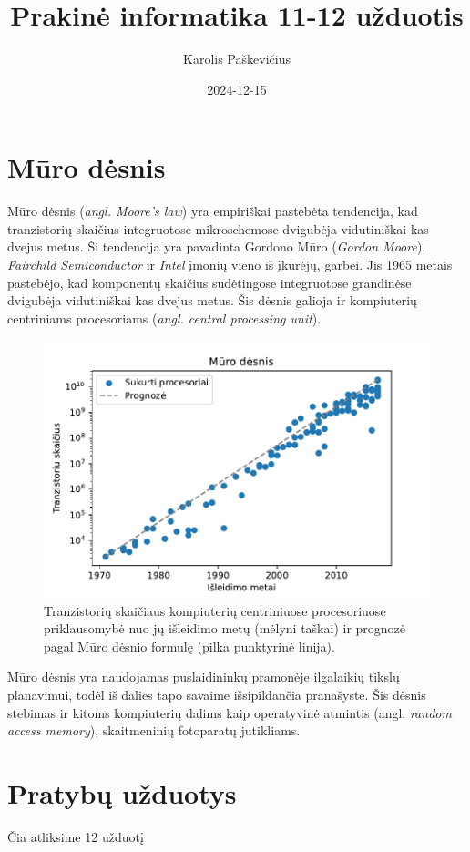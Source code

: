 \documentclass{article}
\title{Prakinė informatika 11-12 užduotis}
\author{Karolis Paškevičius}
\date{2024-12-15}
\begin{document}
\maketitle

\section{Mūro dėsnis}
Mūro dėsnis (\textit{angl. Moore's law}) yra empiriškai pastebėta tendencija, kad tranzistorių skaičius integruotose mikroschemose dvigubėja vidutiniškai kas dvejus metus. Ši tendencija yra pavadinta Gordono Mūro (\textit{Gordon Moore}), \textit{Fairchild Semiconductor} ir \textit{Intel} įmonių vieno iš įkūrėjų, garbei. Jis 1965 metais pastebėjo, kad komponentų skaičius sudėtingose integruotose grandinėse dvigubėja vidutiniškai kas dvejus metus. Šis dėsnis galioja ir kompiuterių centriniams procesoriams (\textit{angl. central processing unit}).
\begin{figure}[h!]
    \raggedright
    \includegraphics[width=\textwidth]{muro_desnis.pdf}
    \caption{Tranzistorių skaičiaus kompiuterių centriniuose procesoriuose priklausomybė nuo jų išleidimo metų (mėlyni taškai) ir prognozė pagal Mūro dėsnio formulę (pilka punktyrinė linija).}
    \label{fig:muro}
\end{figure}

Mūro dėsnis yra naudojamas puslaidininkų pramonėje ilgalaikių tikslų 
planavimui, todėl iš dalies tapo savaime išsipildančia pranašyste. Šis dėsnis stebimas ir kitoms kompiuterių dalims kaip operatyvinė atmintis (angl. \textit{random access memory}), skaitmeninių fotoparatų jutikliams.


\section{Pratybų užduotys}  %
Čia atliksime 12 užduotį
\end{document}
